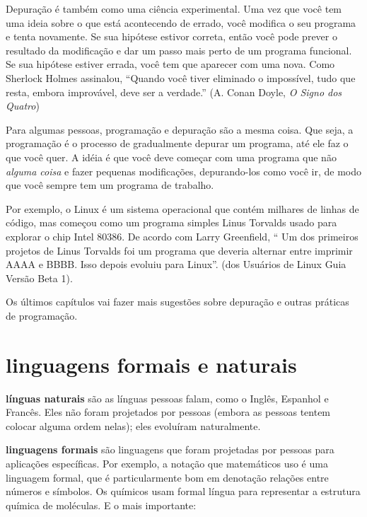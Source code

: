 \documentclass[10pt]{book}
\begin{document}
Depuração é também como uma ciência experimental. Uma vez que você tem uma ideia
sobre o que está acontecendo de errado, você modifica o seu programa e tenta novamente. Se
sua hipótese estivor correta, então você pode prever o resultado da
modificação e dar um passo mais perto de um programa funcional. Se
sua hipótese estiver errada, você tem que aparecer com uma nova. Como
Sherlock Holmes assinalou, ``Quando você tiver eliminado o
impossível, tudo que resta, embora improvável, deve ser a verdade.''
(A. Conan Doyle, {\em O Signo dos Quatro})

Para algumas pessoas, programação e depuração são a mesma coisa. Que
seja, a programação é o processo de gradualmente depurar um programa, até
ele faz o que você quer. A idéia é que você deve começar com uma
programa que não {\em alguma coisa} e fazer pequenas modificações,
depurando-los como você ir, de modo que você sempre tem um programa de trabalho.

Por exemplo, o Linux é um sistema operacional que contém milhares de
linhas de código, mas começou como um programa simples Linus Torvalds
usado para explorar o chip Intel 80386. De acordo com Larry Greenfield,
`` Um dos primeiros projetos de Linus Torvalds foi um programa que deveria alternar
entre imprimir AAAA e BBBB. Isso depois evoluiu para Linux''.
({\Em dos Usuários de Linux Guia} Versão Beta 1).

Os últimos capítulos vai fazer mais sugestões sobre depuração e outras
práticas de programação.


\section{linguagens formais e naturais}

{\bf línguas naturais} são as línguas pessoas falam,
como o Inglês, Espanhol e Francês. Eles não foram projetados
por pessoas (embora as pessoas tentem colocar alguma ordem nelas);
eles evoluíram naturalmente.

{\bf linguagens formais} são linguagens que foram projetadas por pessoas para
aplicações específicas. Por exemplo, a notação que matemáticos
uso é uma linguagem formal, que é particularmente bom em denotação
relações entre números e símbolos. Os químicos usam formal
língua para representar a estrutura química de moléculas. E
o mais importante:
\end{document}
